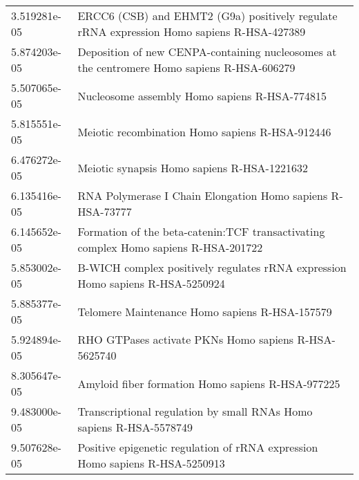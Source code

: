 \begin{longtable}{p{2.4cm}p{14.5cm}}
             3.519281e-05 &                                             ERCC6 (CSB) and EHMT2 (G9a) positively regulate rRNA expression Homo sapiens R-HSA-427389 \\
             5.874203e-05 &                                            Deposition of new CENPA-containing nucleosomes at the centromere Homo sapiens R-HSA-606279 \\
             5.507065e-05 &                                                                                         Nucleosome assembly Homo sapiens R-HSA-774815 \\
             5.815551e-05 &                                                                                       Meiotic recombination Homo sapiens R-HSA-912446 \\
             6.476272e-05 &                                                                                           Meiotic synapsis Homo sapiens R-HSA-1221632 \\
             6.135416e-05 &                                                                            RNA Polymerase I Chain Elongation Homo sapiens R-HSA-73777 \\
             6.145652e-05 &                                                   Formation of the beta-catenin:TCF transactivating complex Homo sapiens R-HSA-201722 \\
             5.853002e-05 &                                                        B-WICH complex positively regulates rRNA expression Homo sapiens R-HSA-5250924 \\
             5.885377e-05 &                                                                                        Telomere Maintenance Homo sapiens R-HSA-157579 \\
             5.924894e-05 &                                                                                  RHO GTPases activate PKNs Homo sapiens R-HSA-5625740 \\
             8.305647e-05 &                                                                                     Amyloid fiber formation Homo sapiens R-HSA-977225 \\
             9.483000e-05 &                                                                   Transcriptional regulation by small RNAs Homo sapiens R-HSA-5578749 \\
             9.507628e-05 &                                                          Positive epigenetic regulation of rRNA expression Homo sapiens R-HSA-5250913 \\

\end{longtable}
